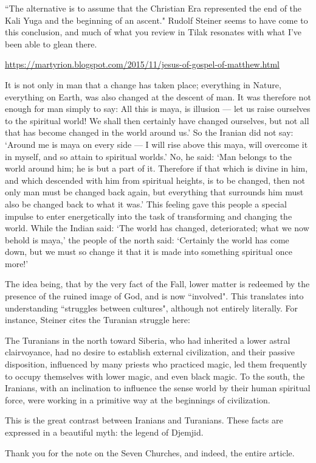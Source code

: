 \begin{footnotesize}
\begin{sffamily}
``The alternative is to assume that the Christian Era represented the end of the Kali Yuga and the beginning of an ascent." Rudolf Steiner seems to have come to this conclusion, and much of what you review in Tilak resonates with what I've been able to glean there.

\url{https://martyrion.blogspot.com/2015/11/jesus-of-gospel-of-matthew.html}

\begin{quotex}
It is not only in man that a change has taken place; everything in Nature, everything on Earth, was also changed at the descent of man. It was therefore not enough for man simply to say: All this is maya, is illusion — let us raise ourselves to the spiritual world! We shall then certainly have changed ourselves, but not all that has become changed in the world around us.' So the Iranian did not say: `Around me is maya on every side — I will rise above this maya, will overcome it in myself, and so attain to spiritual worlds.' No, he said: `Man belongs to the world around him; he is but a part of it. Therefore if that which is divine in him, and which descended with him from spiritual heights, is to be changed, then not only man must be changed back again, but everything that surrounds him must also be changed back to what it was.' This feeling gave this people a special impulse to enter energetically into the task of transforming and changing the world. While the Indian said: `The world has changed, deteriorated; what we now behold is maya,' the people of the north said: `Certainly the world has come down, but we must so change it that it is made into something spiritual once more!'

\end{quotex}
The idea being, that by the very fact of the Fall, lower matter is redeemed by the presence of the ruined image of God, and is now ``involved". This translates into understanding ``struggles between cultures", although not entirely literally. For instance, Steiner cites the Turanian struggle here:

\begin{quotex}
The Turanians in the north toward Siberia, who had inherited a lower astral clairvoyance, had no desire to establish external civilization, and their passive disposition, influenced by many priests who practiced magic, led them frequently to occupy themselves with lower magic, and even black magic. To the south, the Iranians, with an inclination to influence the sense world by their human spiritual force, were working in a primitive way at the beginnings of civilization.

This is the great contrast between Iranians and Turanians. These facts are expressed in a beautiful myth: the legend of Djemjid. 

\end{quotex}
Thank you for the note on the Seven Churches, and indeed, the entire article.


\end{sffamily}\end{footnotesize}
